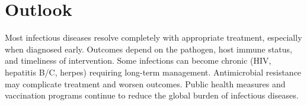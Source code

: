 \section{Outlook}
Most infectious diseases resolve completely with appropriate treatment, especially when diagnosed early. Outcomes depend on the pathogen, host immune status, and timeliness of intervention. Some infections can become chronic (HIV, hepatitis B/C, herpes) requiring long-term management. Antimicrobial resistance may complicate treatment and worsen outcomes. Public health measures and vaccination programs continue to reduce the global burden of infectious diseases.
